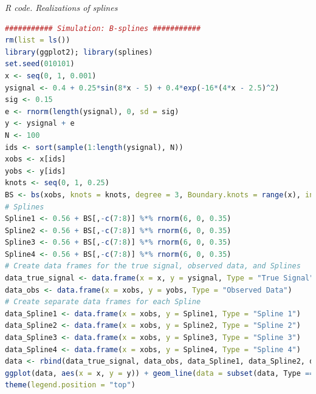 \begin{tcolorbox}[enhanced,width=4.67in,center upper,
	fontupper=\large\bfseries,drop shadow southwest,sharp corners]
	\textit{R code. Realizations of splines}
	\begin{VF}
		\begin{lstlisting}[language=R]
########### Simulation: B-splines ###########
rm(list = ls())
library(ggplot2); library(splines)
set.seed(010101)
x <- seq(0, 1, 0.001)
ysignal <- 0.4 + 0.25*sin(8*x - 5) + 0.4*exp(-16*(4*x - 2.5)^2)
sig <- 0.15
e <- rnorm(length(ysignal), 0, sd = sig)
y <- ysignal + e
N <- 100
ids <- sort(sample(1:length(ysignal), N))
xobs <- x[ids]
yobs <- y[ids]
knots <- seq(0, 1, 0.25)
BS <- bs(xobs, knots = knots, degree = 3, Boundary.knots = range(x), intercept = FALSE)
# Splines
Spline1 <- 0.56 + BS[,-c(7:8)] %*% rnorm(6, 0, 0.35)
Spline2 <- 0.56 + BS[,-c(7:8)] %*% rnorm(6, 0, 0.35)
Spline3 <- 0.56 + BS[,-c(7:8)] %*% rnorm(6, 0, 0.35)
Spline4 <- 0.56 + BS[,-c(7:8)] %*% rnorm(6, 0, 0.35)
# Create data frames for the true signal, observed data, and Splines
data_true_signal <- data.frame(x = x, y = ysignal, Type = "True Signal")
data_obs <- data.frame(x = xobs, y = yobs, Type = "Observed Data")
# Create separate data frames for each Spline
data_Spline1 <- data.frame(x = xobs, y = Spline1, Type = "Spline 1")
data_Spline2 <- data.frame(x = xobs, y = Spline2, Type = "Spline 2")
data_Spline3 <- data.frame(x = xobs, y = Spline3, Type = "Spline 3")
data_Spline4 <- data.frame(x = xobs, y = Spline4, Type = "Spline 4")
data <- rbind(data_true_signal, data_obs, data_Spline1, data_Spline2, data_Spline3, data_Spline4)
ggplot(data, aes(x = x, y = y)) + geom_line(data = subset(data, Type == "True Signal"), aes(color = "True Signal"), linewidth = 1) + geom_point(data = subset(data, Type == "Observed Data"), aes(color = "Observed Data"), shape = 16) + geom_line(data = subset(data, Type == "Spline 1"), aes(color = "Splines"), linewidth = 1, linetype = "solid") + geom_line(data = subset(data, Type == "Spline 2"), aes(color = "Splines"), linewidth = 1, linetype = "solid") + geom_line(data = subset(data, Type == "Spline 3"), aes(color = "Splines"), linewidth = 1, linetype = "solid") + geom_line(data = subset(data, Type == "Spline 4"), aes(color = "Splines"), linewidth = 1, linetype = "solid") + scale_color_manual(values = c("True Signal" = "black", "Observed Data" = "red", "Splines" = "blue")) + labs(y = "y", color = "Legend") + theme_minimal() +
theme(legend.position = "top")
\end{lstlisting}
	\end{VF}
\end{tcolorbox}

